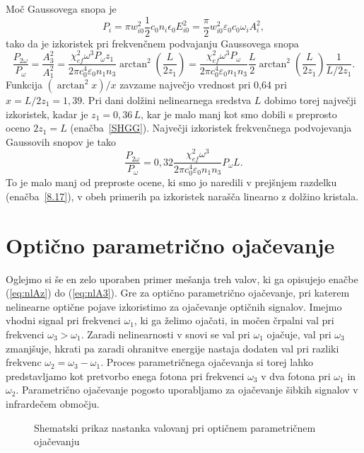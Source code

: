Moč Gaussovega snopa je
\begin{equation}
P_{i}=\pi w_{i0}^{2} \frac{1}{2}c_0 n_i \epsilon_{0}E_{i0}^{2}=
\frac{\pi}{2}w_{i0}^{2}\varepsilon_0 c_0 \omega_{i} A_{i}^{2},
\label{8.26}
\end{equation}
tako da je izkoristek pri frekvenčnem podvajanju Gaussovega snopa 
\begin{equation}
\frac{P_{2\omega}}{P_{\omega}}=\frac{A_3^2}{A_1^2} = 
\frac{\chi_{ef}^2 \omega^3 P_\omega z_1}{2 \pi c_0^4 \varepsilon_0 n_1 n_3} 
\arctan^2 \left( \frac{L}{2z_1}\right)
= \frac{\chi_{ef}^2 \omega^3 P_\omega}{2 \pi c_0^4 \varepsilon_0 n_1 n_3} \frac{L}{2}
\arctan^2 \left( \frac{L}{2z_1}\right) \frac{1}{L/2z_1}.
\label{8.27}
\end{equation}
Funkcija $(\arctan^{2}x)/x$ zavzame največjo vrednost pri 0,64 pri $x =L/2z_1=1,39$.
Pri dani dolžini nelinearnega sredstva $L$ dobimo torej največji
izkoristek, kadar je $z_{1}=0,36\,L$, kar je malo manj kot smo dobili
s preprosto oceno $2z_{1}=L$ (enačba~\ref{SHGG}). Največji izkoristek
frekvenčnega podvojevanja Gaussovih snopov je tako
\begin{equation}
\frac{P_{2\omega}}{P_{\omega}}
= 0,32 \frac{\chi_{ef}^2 \omega^3 }{2 \pi c_0^4 \varepsilon_0 n_1 n_3} P_\omega L.
\label{8.28}
\end{equation}
To je malo manj od preproste ocene, ki smo jo naredili v prejšnjem razdelku (enačba~\ref{8.17}),
v obeh primerih pa izkoristek narašča linearno z dolžino kristala.

\section{Optično parametrično ojačevanje}

Oglejmo si še en zelo uporaben primer mešanja treh valov, 
ki ga opisujejo enačbe (\ref{eq:nlAz}) do (\ref{eq:nlA3}). Gre za
optično parametrično ojačevanje, pri katerem nelinearne optične pojave
izkoristimo za ojačevanje optičnih signalov. Imejmo vhodni
signal pri frekvenci $\omega_{1}$, ki ga želimo ojačati, in močen črpalni val
pri frekvenci $\omega_{3}>\omega_{1}$. Zaradi nelinearnosti v snovi se 
val pri $\omega_{1}$ ojačuje, val pri $\omega_{3}$ zmanjšuje, hkrati pa zaradi
ohranitve energije nastaja dodaten val pri razliki frekvenc
$\omega_{2}=\omega_{3}-\omega_{1}$. Proces parametričnega ojačevanja 
si torej lahko predstavljamo kot pretvorbo enega fotona pri frekvenci 
$\omega_{3}$ v dva fotona pri $\omega_{1}$ in $\omega_{2}$.
Parametrično ojačevanje pogosto uporabljamo za ojačevanje šibkih signalov 
v infrardečem območju.
\begin{figure}[h]
\centering
\def\svgwidth{100truemm} 

\caption{Shematski prikaz nastanka valovanj pri optičnem parametričnem ojačevanju}
\label{fig:opa2}
\end{figure}

